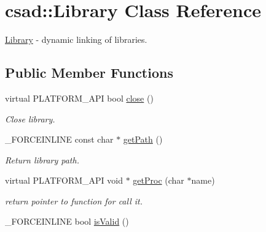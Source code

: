 \hypertarget{classcsad_1_1_library}{\section{csad\-:\-:Library Class Reference}
\label{classcsad_1_1_library}
}


\hyperlink{classcsad_1_1_library}{Library} -\/ dynamic linking of libraries.  


\subsection*{Public Member Functions}
\begin{DoxyCompactItemize}
\item 
\hypertarget{classcsad_1_1_library_ae3fd3ba36696fb8ca706565077cb617d}{virtual P\-L\-A\-T\-F\-O\-R\-M\-\_\-\-A\-P\-I bool \hyperlink{classcsad_1_1_library_ae3fd3ba36696fb8ca706565077cb617d}{close} ()}\label{classcsad_1_1_library_ae3fd3ba36696fb8ca706565077cb617d}

\begin{DoxyCompactList}\small\item\em Close library. \end{DoxyCompactList}\item 
\hypertarget{classcsad_1_1_library_a3cd79316dbff03bad5e5ffdb4d5f9da8}{\-\_\-\-F\-O\-R\-C\-E\-I\-N\-L\-I\-N\-E const char $\ast$ \hyperlink{classcsad_1_1_library_a3cd79316dbff03bad5e5ffdb4d5f9da8}{get\-Path} ()}\label{classcsad_1_1_library_a3cd79316dbff03bad5e5ffdb4d5f9da8}

\begin{DoxyCompactList}\small\item\em Return library path. \end{DoxyCompactList}\item 
\hypertarget{classcsad_1_1_library_a4dc8d5bc6071657bc7fca97cbf1246b7}{virtual P\-L\-A\-T\-F\-O\-R\-M\-\_\-\-A\-P\-I void $\ast$ \hyperlink{classcsad_1_1_library_a4dc8d5bc6071657bc7fca97cbf1246b7}{get\-Proc} (char $\ast$name)}\label{classcsad_1_1_library_a4dc8d5bc6071657bc7fca97cbf1246b7}

\begin{DoxyCompactList}\small\item\em return pointer to function for call it. \end{DoxyCompactList}\item 
\hypertarget{classcsad_1_1_library_a9fba9251066766ed6dac9f729039fc43}{\-\_\-\-F\-O\-R\-C\-E\-I\-N\-L\-I\-N\-E bool \hyperlink{classcsad_1_1_library_a9fba9251066766ed6dac9f729039fc43}{is\-Valid} ()}\label{classcsad_1_1_library_a9fba9251066766ed6dac9f729039fc43}


\end{DoxyCompactItemize}
